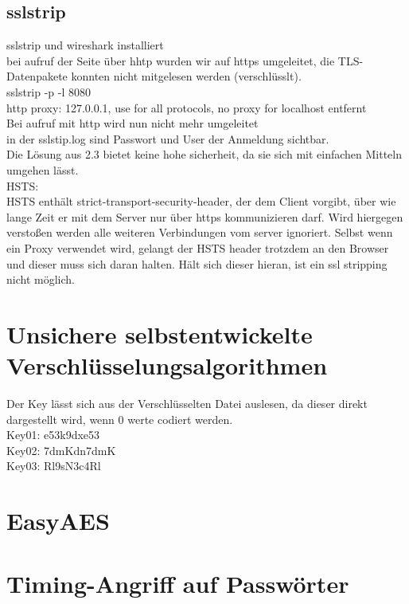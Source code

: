 \documentclass[12pt]{article}
\theoremstyle{plain}
\begin{document}
\subsection{sslstrip}
sslstrip und wireshark installiert\\
bei aufruf der Seite über hhtp wurden wir auf https umgeleitet, die TLS-Datenpakete konnten nicht mitgelesen werden (verschlüsslt).\\
sslstrip -p -l 8080\\
http proxy: 127.0.0.1, use for all protocols, no proxy for localhost entfernt\\
Bei aufruf mit http wird nun nicht mehr umgeleitet\\
in der sslstip.log sind Passwort und User der Anmeldung sichtbar.\\
Die Lösung aus 2.3 bietet keine hohe sicherheit, da sie sich mit einfachen Mitteln umgehen lässt.\\
HSTS:\\
HSTS enthält strict-transport-security-header, der dem Client vorgibt, über wie lange Zeit er mit dem Server nur über https kommunizieren darf. Wird hiergegen verstoßen werden alle weiteren Verbindungen vom server ignoriert. Selbst wenn ein Proxy verwendet wird, gelangt der HSTS header trotzdem an den Browser und dieser muss sich daran halten. Hält sich dieser hieran, ist ein ssl stripping nicht möglich.
\section{Unsichere selbstentwickelte Verschlüsselungsalgorithmen}
Der Key lässt sich aus der Verschlüsselten Datei auslesen, da dieser direkt dargestellt wird, wenn 0 werte codiert werden.\\
Key01: e53k9dxe53\\
Key02: 7dmKdn7dmK\\
Key03: Rl9sN3c4Rl\\
\section{EasyAES}
\section{Timing-Angriff auf Passwörter}
\end{document}
